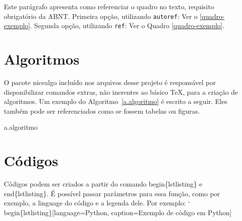 Este parágrafo apresenta como referenciar o quadro no texto, requisito
obrigatório da ABNT. 
Primeira opção, utilizando \texttt{autoref}: Ver o \autoref{quadro-exemplo}. 
Segunda opção, utilizando  \texttt{ref}: Ver o Quadro \ref{quadro-exemplo}.



\section{Algoritmos}
\label{s.algoritmos}

O pacote nicealgo incluído nos arquivos desse projeto é responsável por disponibilizar comandos extras, não inerentes ao básico TeX, para a criação de algoritmos. Um exemplo do Algoritmo~\ref{a.algoritmo} é escrito a seguir. Eles também pode ser referenciados como se fossem tabelas ou figuras.


\par
{}

\begin{nicealgo}{a.algoritmo}
	\naPREAMBLE
	\naBODY
	\naEND{}
	\naEND{}
	\naEND{}
	\naEND{}
	\naEND{}
\end{nicealgo}


\section{Códigos}
\label{s.codigos}

Códigos podem ser criados a partir do comando begin\{lstlisting\} e end\{lstlisting\}. É possível passar parâmetros para essa função, como por exemplo, a linguage do código e a legenda dele. Por exemplo: \char`\\begin\{lstlisting\}[language=Python, caption=Exemplo de código em Python]

